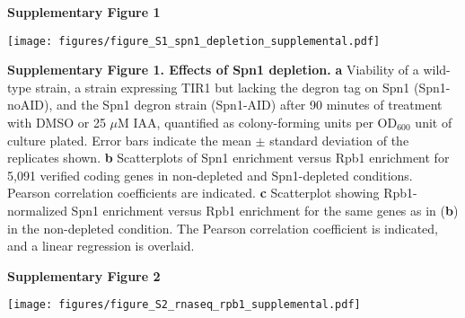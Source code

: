 \documentclass[9pt]{extarticle}
\begin{document}
\textbf{\large Supplementary Figure 1}

{\texttt{[image: figures/figure\_S1\_spn1\_depletion\_supplemental.pdf]}\par}

\textbf{Supplementary Figure 1. Effects of Spn1 depletion.}
\textbf{a} Viability of a wild-type strain, a strain expressing TIR1 but lacking the degron tag on Spn1 (Spn1-noAID), and the Spn1 degron strain (Spn1-AID) after 90 minutes of treatment with DMSO or 25 $\mu$M IAA, quantified as colony-forming units per OD$_{600}$ unit of culture plated.
Error bars indicate the mean $\pm$ standard deviation of the replicates shown.
\textbf{b} Scatterplots of Spn1 enrichment versus Rpb1 enrichment for 5,091 verified coding genes in non-depleted and Spn1-depleted conditions.
Pearson correlation coefficients are indicated.
\textbf{c} Scatterplot showing Rpb1-normalized Spn1 enrichment versus Rpb1 enrichment for the same genes as in (\textbf{b}) in the non-depleted condition.
The Pearson correlation coefficient is indicated, and a linear regression is overlaid.

\newpage

\textbf{\large Supplementary Figure 2}

{\texttt{[image: figures/figure\_S2\_rnaseq\_rpb1\_supplemental.pdf]}\par}
\end{document}
